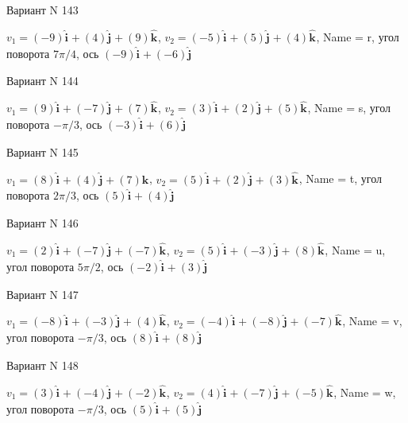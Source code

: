\documentclass[11pt]{report}
\begin{document}
Вариант N 143

$v_1 = \left(-9\right)\mathbf{\hat{i}_{}} + \left(4\right)\mathbf{\hat{j}_{}} + \left(9\right)\mathbf{\hat{k}_{}}$, $v_2 = \left(-5\right)\mathbf{\hat{i}_{}} + \left(5\right)\mathbf{\hat{j}_{}} + \left(4\right)\mathbf{\hat{k}_{}}$, Name = r, угол поворота $7 \pi / 4$, ось $\left(-9\right)\mathbf{\hat{i}_{}} + \left(-6\right)\mathbf{\hat{j}_{}}$

Вариант N 144

$v_1 = \left(9\right)\mathbf{\hat{i}_{}} + \left(-7\right)\mathbf{\hat{j}_{}} + \left(7\right)\mathbf{\hat{k}_{}}$, $v_2 = \left(3\right)\mathbf{\hat{i}_{}} + \left(2\right)\mathbf{\hat{j}_{}} + \left(5\right)\mathbf{\hat{k}_{}}$, Name = s, угол поворота $- \pi / 3$, ось $\left(-3\right)\mathbf{\hat{i}_{}} + \left(6\right)\mathbf{\hat{j}_{}}$

Вариант N 145

$v_1 = \left(8\right)\mathbf{\hat{i}_{}} + \left(4\right)\mathbf{\hat{j}_{}} + \left(7\right)\mathbf{\hat{k}_{}}$, $v_2 = \left(5\right)\mathbf{\hat{i}_{}} + \left(2\right)\mathbf{\hat{j}_{}} + \left(3\right)\mathbf{\hat{k}_{}}$, Name = t, угол поворота $2 \pi / 3$, ось $\left(5\right)\mathbf{\hat{i}_{}} + \left(4\right)\mathbf{\hat{j}_{}}$

Вариант N 146

$v_1 = \left(2\right)\mathbf{\hat{i}_{}} + \left(-7\right)\mathbf{\hat{j}_{}} + \left(-7\right)\mathbf{\hat{k}_{}}$, $v_2 = \left(5\right)\mathbf{\hat{i}_{}} + \left(-3\right)\mathbf{\hat{j}_{}} + \left(8\right)\mathbf{\hat{k}_{}}$, Name = u, угол поворота $5 \pi / 2$, ось $\left(-2\right)\mathbf{\hat{i}_{}} + \left(3\right)\mathbf{\hat{j}_{}}$

Вариант N 147

$v_1 = \left(-8\right)\mathbf{\hat{i}_{}} + \left(-3\right)\mathbf{\hat{j}_{}} + \left(4\right)\mathbf{\hat{k}_{}}$, $v_2 = \left(-4\right)\mathbf{\hat{i}_{}} + \left(-8\right)\mathbf{\hat{j}_{}} + \left(-7\right)\mathbf{\hat{k}_{}}$, Name = v, угол поворота $- \pi / 3$, ось $\left(8\right)\mathbf{\hat{i}_{}} + \left(8\right)\mathbf{\hat{j}_{}}$

Вариант N 148

$v_1 = \left(3\right)\mathbf{\hat{i}_{}} + \left(-4\right)\mathbf{\hat{j}_{}} + \left(-2\right)\mathbf{\hat{k}_{}}$, $v_2 = \left(4\right)\mathbf{\hat{i}_{}} + \left(-7\right)\mathbf{\hat{j}_{}} + \left(-5\right)\mathbf{\hat{k}_{}}$, Name = w, угол поворота $- \pi / 3$, ось $\left(5\right)\mathbf{\hat{i}_{}} + \left(5\right)\mathbf{\hat{j}_{}}$
\end{document}

